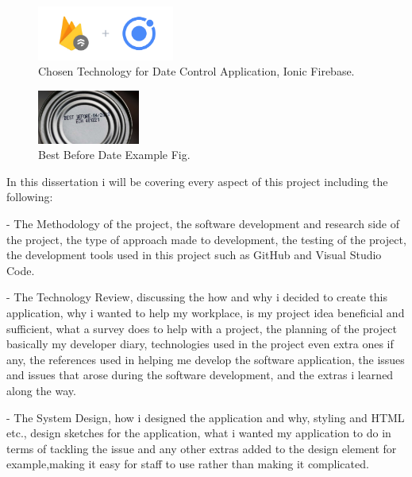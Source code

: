 \begin{figure}[h!]
	\caption{Chosen Technology for Date Control Application, Ionic Firebase.}
	\label{image:ionicfirebase}
	\centering
	\includegraphics[width=0.4\textwidth]{images/ionicfirebase.png}
\end{figure}

\begin{figure}[h!]
	\caption{Best Before Date Example Fig.}
	\label{image:bbdate}
	\centering
	\includegraphics[width=0.3\textwidth]{images/bbdate.jpg}
\end{figure}

In this dissertation i will be covering every aspect of this project including the following:
\newline 

- The Methodology of the project, the software development and research side of the project, the type of approach made to development, the testing of the project, the development tools used in this project such as GitHub and Visual Studio Code.
\newline

- The Technology Review, discussing the how and why i decided to create this application, why i wanted to help my workplace, is my project idea beneficial and sufficient, what a survey does to help with a project, the planning of the project basically my developer diary, technologies used in the project even extra ones if any, the references used in helping me develop the software application, the issues and issues that arose during the software development, and the extras i learned along the way.
\newline

- The System Design, how i designed the application and why, styling and HTML etc., design sketches for the application, what i wanted my application to do in terms of tackling the issue and any other extras added to the design element for example,making it easy for staff to use rather than making it complicated.
\newline

